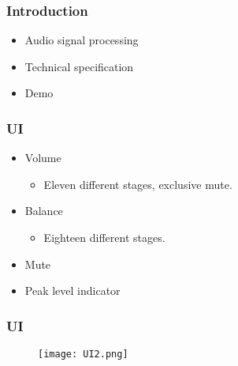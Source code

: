 
\begin{frame}
	\frametitle{Introduction}
		\begin{itemize}
			\item Audio signal processing
			\item Technical specification
			\item Demo
		\end{itemize}
\end{frame}


\begin{frame}
\frametitle{UI}
	\begin{itemize}
		\item Volume
			\begin{itemize}
				\item Eleven different stages, exclusive mute.
			\end{itemize}
		\item Balance
		\begin{itemize}
				\item Eighteen different stages.
			\end{itemize}
		\item Mute
		\item Peak level indicator
	\end{itemize}
\end{frame}



\begin{frame}
	\frametitle{UI}
	  \begin{figure}[h]
    \centering 
    \texttt{[image: UI2.png]} 
       \label{UI}
  \end{figure}
\end{frame}


